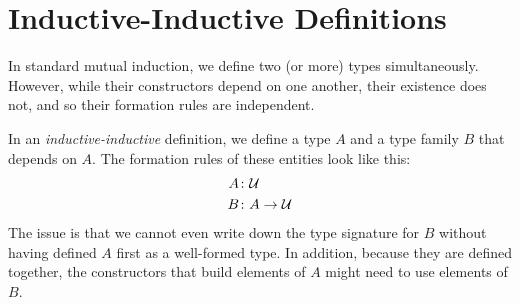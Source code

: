 \section{Inductive-Inductive Definitions}

In standard mutual induction, we define two (or more) types simultaneously. However, while their constructors depend on one another, their existence does not, and so their formation rules are independent.

In an \textsl{inductive-inductive} definition, we define a type $A$ and a type family $B$ that depends on $A$. The formation rules of these entities look like this:
\begin{align*}
    A&\colon\univ\\
    B&\colon A\to\univ
\end{align*}
The issue is that we cannot even write down the type signature for $B$ without having defined $A$ first as a well-formed type. In addition, because they are defined together, the constructors that build elements of $A$ might need to use elements of $B$.

